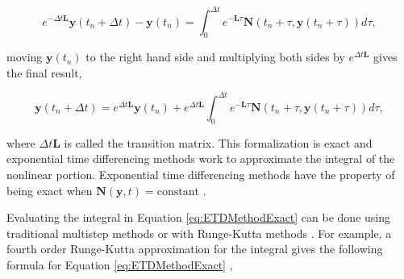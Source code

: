 \begin{equation}
    e^{-\Delta t\boldsymbol{L}}\boldsymbol{y}(t_{n} + \Delta t) - \boldsymbol{y}(t_{n}) = \int_{0}^{\Delta t}e^{-\boldsymbol{L}\tau}\boldsymbol{N}(t_{n} + \tau,\boldsymbol{y}(t_{n} + \tau))d\tau, 
\end{equation}



\noindent moving $\boldsymbol{y}(t_{n})$ to the right hand side and multiplying both sides by $e^{\Delta t \boldsymbol{L}}$ gives the final result,

\begin{equation}
    \boldsymbol{y}(t_{n} + \Delta t) = e^{\Delta t\boldsymbol{L}}\boldsymbol{y}(t_{n}) + e^{\Delta t\boldsymbol{L}}\int_{0}^{\Delta t}e^{-\boldsymbol{L}\tau}\boldsymbol{N}(t_{n} + \tau,\boldsymbol{y}(t_{n} + \tau))d\tau,
    \label{eq:ETDMethodExact}
\end{equation}

\noindent where $\Delta t \boldsymbol{L}$ is called the transition matrix.
This formalization is exact and exponential time differencing methods work to approximate the integral of the nonlinear portion. Exponential  time  differencing  methods have the property of being exact when $\boldsymbol{N}(\boldsymbol{y},t) = \text{constant}$ \cite{ash2009}.

Evaluating the integral in Equation \ref{eq:ETDMethodExact} can be done using traditional multistep methods or with Runge-Kutta methods \cite{cox2002}. For example, a fourth order Runge-Kutta approximation for the integral gives the following formula for Equation \ref{eq:ETDMethodExact} \cite{cox2002},


